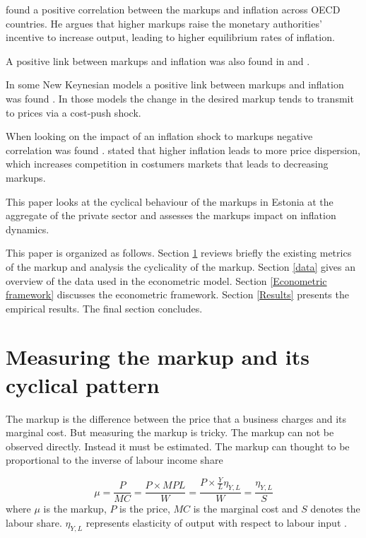 \documentclass[twoside]{article}
\begin{document}
\begin{multicols}{2}
\citet{Neiss2001Markup} found a positive correlation between the markups and inflation across OECD countries. He argues that higher markups raise the monetary authorities' incentive to increase output, leading to higher equilibrium rates of inflation. 

A positive link between markups and inflation was also found in \citet{Chirinko2000Market} and \cite{Bowdler2004Testing}. 

In some New Keynesian models a positive link between markups and inflation was found \citep{Ball2005Monetary,Steinsson2003Optimal}. In those models the change in the desired markup tends to transmit to prices via a cost-push shock. 

When looking on the impact of an inflation shock to markups negative correlation was found \citep{Benabou1992Inflation,Banerjee2005Inflation}. \citet{Benabou1992Inflation} stated that higher inflation leads to more price dispersion, which increases competition in costumers markets that leads to decreasing markups. 


This paper looks at the cyclical behaviour of the markups in Estonia at the aggregate of the private sector and assesses the markups impact on inflation dynamics.  

This paper is organized as follows. Section \ref{Measuring}
reviews briefly the existing metrics of the markup and analysis the cyclicality of the markup. Section \ref{data}  gives an overview of the data used in the econometric model. Section \ref{Econometric framework}  discusses the econometric framework.  Section \ref{Results} presents the empirical results. The final section concludes. 


\section{Measuring the markup and its cyclical pattern}
\label{Measuring}

The markup is the difference between the price that a business charges and its marginal cost. But measuring the markup is tricky. The markup can not be observed directly. Instead it must be estimated. The markup can thought to be proportional to the inverse of labour income share 

\begin{equation}
 \mu = \frac{P}{MC} = \frac{P \times MPL}{W} = \frac{P \times \frac{Y}{L} \eta _{Y,L}}{W} = \frac{\eta _{Y,L}}{S} 
\end{equation}
where $\mu$ is the markup, $P$ is the price, $MC$ is the marginal cost and $S$ denotes the labour share.  $\eta _{Y,L}$ represents elasticity of output with respect to labour input \citep{Klein2011South}. 




\end{multicols}
\end{document}
